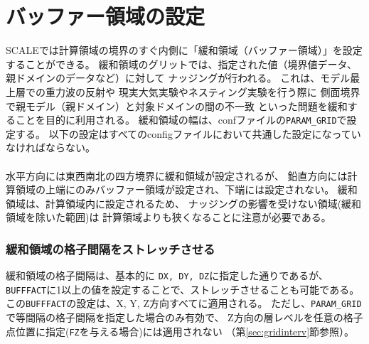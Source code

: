 \section{バッファー領域の設定}
\label{sec:buffer}
SCALEでは計算領域の境界のすぐ内側に「緩和領域（バッファー領域）」を設定することができる。
緩和領域のグリットでは、指定された値（境界値データ、親ドメインのデータなど）に対して
ナッジングが行われる。
これは、モデル最上層での重力波の反射や
現実大気実験やネスティング実験を行う際に
側面境界で親モデル（親ドメイン）と対象ドメインの間の不一致
といった問題を緩和することを目的に利用される。
緩和領域の幅は、confファイルの\verb|PARAM_GRID|で設定する。
以下の設定はすべてのconfigファイルにおいて共通した設定になっていなければならない。\\

\\

水平方向には東西南北の四方境界に緩和領域が設定されるが、
鉛直方向には計算領域の上端にのみバッファー領域が設定され、下端には設定されない。
%
緩和領域は、計算領域内に設定されるため、
ナッジングの影響を受けない領域(緩和領域を除いた範囲)は
計算領域よりも狭くなることに注意が必要である。

\subsubsection{緩和領域の格子間隔をストレッチさせる}
緩和領域の格子間隔は、基本的に \verb|DX, DY, DZ|に指定した通りであるが、
\verb|BUFFFACT|に1以上の値を設定することで、ストレッチさせることも可能である。
この\verb|BUFFFACT|の設定は、X, Y, Z方向すべてに適用される。
ただし、\verb|PARAM_GRID|で等間隔の格子間隔を指定した場合のみ有効で、
Z方向の層レベルを任意の格子点位置に指定(\verb|FZ|を与える場合)には適用されない
（第\ref{sec:gridinterv}節参照）。

